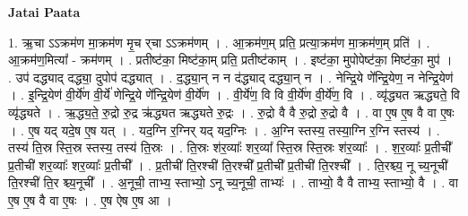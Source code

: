 \documentclass[17pt]{extarticle}
\begin{document}
\textbf{Jatai Paata} \newline

1. ऋ॒चा ऽऽक्रम॑ण मा॒क्रम॑ण मृ॒च र्‌चा ऽऽक्रम॑णम् । . आ॒क्रम॑ण॒म् प्रति॒ प्रत्या॒क्रम॑ण मा॒क्रम॑ण॒म् प्रति॑ । . आ॒क्रम॑ण॒मित्या᳚ - क्रम॑णम् । . प्रतीष्ट॑का॒ मिष्ट॑का॒म् प्रति॒ प्रतीष्ट॑काम् । . इष्ट॑का॒ मुपोपेष्ट॑का॒ मिष्ट॑का॒ मुप॑ । . उप॑ दद्ध्याद् दद्ध्या॒ दुपोप॑ दद्ध्यात् । . द॒द्ध्या॒न् न न द॑द्ध्याद् दद्ध्या॒न् न । . नेन्द्रि॒ये णे᳚न्द्रि॒येण॒ न नेन्द्रि॒येण॑ । . इ॒न्द्रि॒येण॑ वी॒र्ये॑ण वी॒र्ये॑ णेन्द्रि॒ये णे᳚न्द्रि॒येण॑ वी॒र्ये॑ण । . वी॒र्ये॑ण॒ वि वि वी॒र्ये॑ण वी॒र्ये॑ण॒ वि । . व्यृ॑द्ध्यत ऋद्ध्यते॒ वि व्यृ॑द्ध्यते । . ऋ॒द्ध्य॒ते॒ रु॒द्रो रु॒द्र ऋ॑द्ध्यत ऋद्ध्यते रु॒द्रः । . रु॒द्रो वै वै रु॒द्रो रु॒द्रो वै । . वा ए॒ष ए॒ष वै वा ए॒षः । . ए॒ष यद् यदे॒ष ए॒ष यत् । . यद॒ग्नि र॒ग्निर् यद् यद॒ग्निः । . अ॒ग्नि स्तस्य॒ तस्या॒ग्नि र॒ग्नि स्तस्य॑ । . तस्य॑ ति॒स्र स्ति॒स्र स्तस्य॒ तस्य॑ ति॒स्रः । . ति॒स्रः श॑र॒व्याः᳚ शर॒व्या᳚ स्ति॒स्र स्ति॒स्रः श॑र॒व्याः᳚ । . श॒र॒व्याः᳚ प्र॒तीची᳚ प्र॒तीची॑ शर॒व्याः᳚ शर॒व्याः᳚ प्र॒तीची᳚ । . प्र॒तीची॑ ति॒रश्ची॑ ति॒रश्ची᳚ प्र॒तीची᳚ प्र॒तीची॑ ति॒रश्ची᳚ । . ति॒रश्च्य॒ नू च्य॒नूची॑ ति॒रश्ची॑ ति॒र श्च्य॒नूची᳚ । . अ॒नूची॒ ताभ्य॒ स्ताभ्यो॒ ऽनू च्य॒नूची॒ ताभ्यः॑ । . ताभ्यो॒ वै वै ताभ्य॒ स्ताभ्यो॒ वै । . वा ए॒ष ए॒ष वै वा ए॒षः । . ए॒ष ऐष ए॒ष आ । \newline
\end{document}
